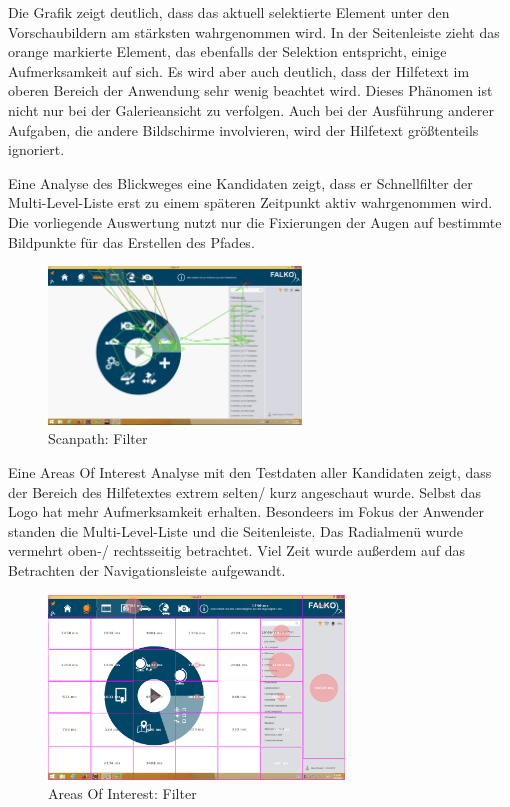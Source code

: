 Die Grafik zeigt deutlich, dass das aktuell selektierte Element unter den Vorschaubildern am stärksten wahrgenommen wird. In der Seitenleiste zieht das orange markierte Element, das ebenfalls der Selektion entspricht, einige Aufmerksamkeit auf sich. Es wird aber auch deutlich, dass der Hilfetext im oberen Bereich der Anwendung sehr wenig beachtet wird. Dieses Phänomen ist nicht nur bei der Galerieansicht zu verfolgen. Auch bei der Ausführung anderer Aufgaben, die andere Bildschirme involvieren, wird der Hilfetext größtenteils ignoriert.\par
Eine Analyse des Blickweges eine Kandidaten zeigt, dass er Schnellfilter der Multi-Level-Liste erst zu einem späteren Zeitpunkt aktiv wahrgenommen wird. Die vorliegende Auswertung nutzt nur die Fixierungen der Augen auf bestimmte Bildpunkte für das Erstellen des Pfades.\par
\begin{figure}[H]
 \centering
 \includegraphics[width=0.6\textwidth]{grafiken/scanpath.png}
 \caption{Scanpath: Filter}
 \label{fig:scanFilter}
\end{figure}
Eine Areas Of Interest Analyse mit den Testdaten aller Kandidaten zeigt, dass der Bereich des Hilfetextes extrem selten/ kurz angeschaut wurde. Selbst das Logo hat mehr Aufmerksamkeit erhalten. Besondeers im Fokus der Anwender standen die Multi-Level-Liste und die Seitenleiste. Das Radialmenü wurde vermehrt oben-/ rechtsseitig betrachtet. Viel Zeit wurde außerdem auf das Betrachten der Navigationsleiste aufgewandt.
\begin{figure}[H]
 \centering
 \includegraphics[width=0.7\textwidth]{grafiken/areas_of_interest_filter.png}
 \caption{Areas Of Interest: Filter}
 \label{fig:aoiFIlter}
\end{figure}
